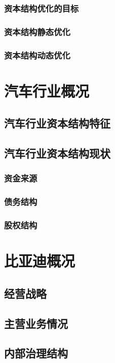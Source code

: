\subsection{资本结构优化的目标}
\subsection{资本结构静态优化}
\subsection{资本结构动态优化}


\chapter{汽车行业概况}

\section{汽车行业资本结构特征}

\section{汽车行业资本结构现状}
\subsection{资金来源}
\subsection{债务结构}
\subsection{股权结构}

\chapter{比亚迪概况}
\section{经营战略}
\section{主营业务情况}
\section{内部治理结构}


